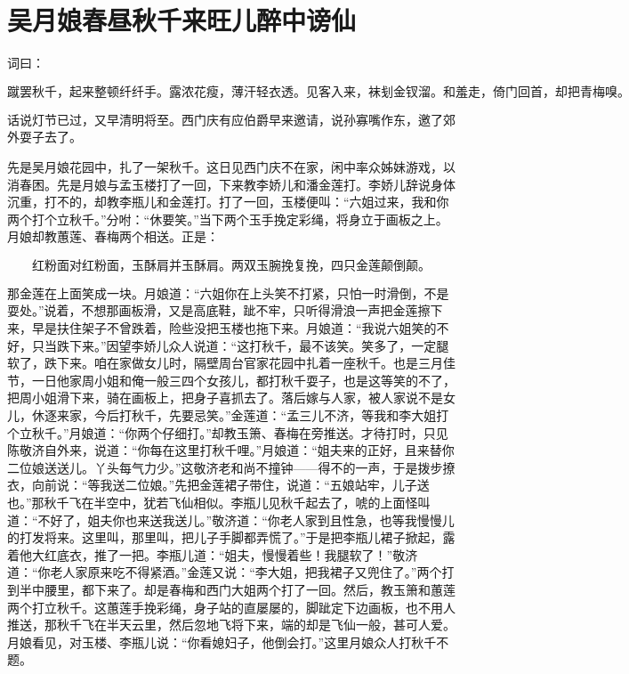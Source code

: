 

\chapter{吴月娘春昼秋千\KG 来旺儿醉中谤仙}


词曰：

\[
蹴罢秋千，起来整顿纤纤手。露浓花瘦，薄汗轻衣透。见客入来，袜刬金钗溜。和羞走，倚门回首，却把青梅嗅。
\]

话说灯节已过，又早清明将至。西门庆有应伯爵早来邀请，说孙寡嘴作东，邀了郊外耍子去了。

先是吴月娘花园中，扎了一架秋千。这日见西门庆不在家，闲中率众姊妹游戏，以消春困。先是月娘与孟玉楼打了一回，下来教李娇儿和潘金莲打。李娇儿辞说身体沉重，打不的，却教李瓶儿和金莲打。打了一回，玉楼便叫：“六姐过来，我和你两个打个立秋千。”分咐：“休要笑。”当下两个玉手挽定彩绳，将身立于画板之上。月娘却教蕙莲、春梅两个相送。正是：

\[
红粉面对红粉面，玉酥肩并玉酥肩。
两双玉腕挽复挽，四只金莲颠倒颠。
\]

那金莲在上面笑成一块。月娘道：“六姐你在上头笑不打紧，只怕一时滑倒，不是耍处。”说着，不想那画板滑，又是高底鞋，跐不牢，只听得滑浪一声把金莲擦下来，早是扶住架子不曾跌着，险些没把玉楼也拖下来。月娘道：“我说六姐笑的不好，只当跌下来。”因望李娇儿众人说道：“这打秋千，最不该笑。笑多了，一定腿软了，跌下来。咱在家做女儿时，隔壁周台官家花园中扎着一座秋千。也是三月佳节，一日他家周小姐和俺一般三四个女孩儿，都打秋千耍子，也是这等笑的不了，把周小姐滑下来，骑在画板上，把身子喜抓去了。落后嫁与人家，被人家说不是女儿，休逐来家，今后打秋千，先要忌笑。”金莲道：“孟三儿不济，等我和李大姐打个立秋千。”月娘道：“你两个仔细打。”却教玉箫、春梅在旁推送。才待打时，只见陈敬济自外来，说道：“你每在这里打秋千哩。”月娘道：“姐夫来的正好，且来替你二位娘送送儿。丫头每气力少。”这敬济老和尚不撞钟——得不的一声，于是拨步撩衣，向前说：“等我送二位娘。”先把金莲裙子带住，说道：“五娘站牢，儿子送也。”那秋千飞在半空中，犹若飞仙相似。李瓶儿见秋千起去了，唬的上面怪叫道：“不好了，姐夫你也来送我送儿。”敬济道：“你老人家到且性急，也等我慢慢儿的打发将来。这里叫，那里叫，把儿子手脚都弄慌了。”于是把李瓶儿裙子掀起，露着他大红底衣，推了一把。李瓶儿道：“姐夫，慢慢着些！我腿软了！”敬济道：“你老人家原来吃不得紧酒。”金莲又说：“李大姐，把我裙子又兜住了。”两个打到半中腰里，都下来了。却是春梅和西门大姐两个打了一回。然后，教玉箫和蕙莲两个打立秋千。这蕙莲手挽彩绳，身子站的直屡屡的，脚跐定下边画板，也不用人推送，那秋千飞在半天云里，然后忽地飞将下来，端的却是飞仙一般，甚可人爱。月娘看见，对玉楼、李瓶儿说：“你看媳妇子，他倒会打。”这里月娘众人打秋千不题。

